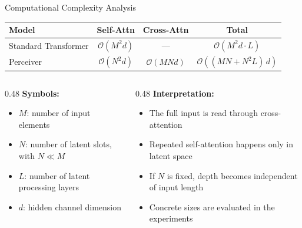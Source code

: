 \documentclass[aspectratio=169,11pt]{beamer}
\begin{document}
\begin{frame}[shrink=5]{Computational Complexity Analysis}
  \small
  \begin{table}
    \centering\small
    \begin{tabular}{lccc}
      \toprule
      \textbf{Model} & \textbf{Self-Attn} & \textbf{Cross-Attn} & \textbf{Total} \\
      \midrule
      Standard Transformer & $\mathcal{O}(M^2 d)$ & --- & $\mathcal{O}(M^2 d \cdot L)$ \\
      \midrule
      Perceiver & $\mathcal{O}(N^2 d)$ & $\mathcal{O}(MNd)$ & $\mathcal{O}((MN + N^2 L)\,d)$ \\
      \bottomrule
    \end{tabular}
  \end{table}

  \vspace{0.5em}
  \begin{columns}[T]
    \begin{column}{0.48\textwidth}
      \textbf{Symbols:}
      \begin{itemize}
        \item $M$: number of input elements
        \item $N$: number of latent slots, with $N \ll M$
        \item $L$: number of latent processing layers
        \item $d$: hidden channel dimension
      \end{itemize}
    \end{column}
    \begin{column}{0.48\textwidth}
      \textbf{Interpretation:}
      \begin{itemize}
        \item The full input is read through cross-attention
        \item Repeated self-attention happens only in latent space
        \item If $N$ is fixed, depth becomes independent of input length
        \item Concrete sizes are evaluated in the experiments
      \end{itemize}
    \end{column}
  \end{columns}
\end{frame}

\end{document}
